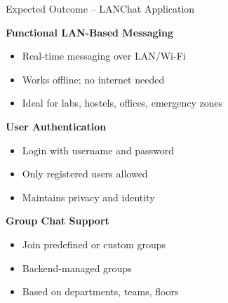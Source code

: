 \documentclass[aspectratio=1610]{beamer}
\begin{document}
\begin{frame}{Expected Outcome – LANChat Application}

\small %
\textbf{Functional LAN-Based Messaging}
\begin{itemize}
    \item Real-time messaging over LAN/Wi-Fi
    \item Works offline; no internet needed
    \item Ideal for labs, hostels, offices, emergency zones
\end{itemize}

\vspace{0.2cm}
\textbf{User Authentication}
\begin{itemize}
    \item Login with username and password
    \item Only registered users allowed
    \item Maintains privacy and identity
\end{itemize}

\vspace{0.2cm}
\textbf{Group Chat Support}
\begin{itemize}
    \item Join predefined or custom groups
    \item Backend-managed groups
    \item Based on departments, teams, floors
\end{itemize}

\end{frame}
\end{document}

